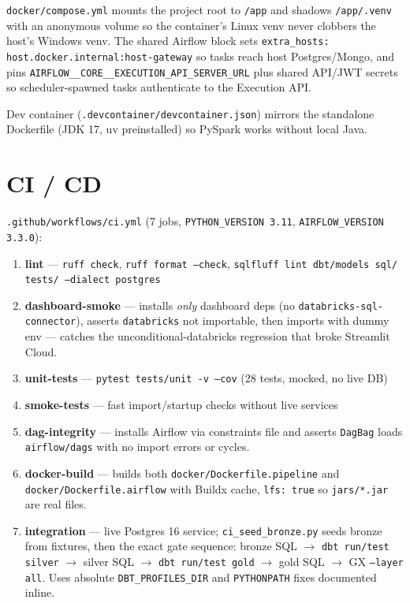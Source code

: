 \documentclass[11pt,a4paper]{article}
\begin{document}
\texttt{docker/compose.yml} mounts the project root to \texttt{/app} and shadows \texttt{/app/.venv} with an anonymous volume so the container's Linux venv never clobbers the host's Windows venv. The shared Airflow block sets \texttt{extra\_hosts: host.docker.internal:host-gateway} so tasks reach host Postgres/Mongo, and pins \texttt{AIRFLOW\_\_CORE\_\_EXECUTION\_API\_SERVER\_URL} plus shared API/JWT secrets so scheduler-spawned tasks authenticate to the Execution API.

Dev container (\texttt{.devcontainer/devcontainer.json}) mirrors the standalone Dockerfile (JDK 17, uv preinstalled) so PySpark works without local Java.

\section{CI / CD}

\texttt{.github/workflows/ci.yml} (7 jobs, \texttt{PYTHON\_VERSION 3.11}, \texttt{AIRFLOW\_VERSION 3.3.0}):

\begin{enumerate}[leftmargin=1.4em,itemsep=2pt]
  \item \textbf{lint} — \texttt{ruff check}, \texttt{ruff format --check}, \texttt{sqlfluff lint dbt/models sql/ tests/ --dialect postgres}
  \item \textbf{dashboard-smoke} — installs \emph{only} dashboard deps (no \texttt{databricks-sql-connector}), asserts \texttt{databricks} not importable, then imports with dummy env — catches the unconditional-databricks regression that broke Streamlit Cloud.
  \item \textbf{unit-tests} — \texttt{pytest tests/unit -v --cov} (28 tests, mocked, no live DB)
  \item \textbf{smoke-tests} — fast import/startup checks without live services
  \item \textbf{dag-integrity} — installs Airflow via constraints file and asserts \texttt{DagBag} loads \texttt{airflow/dags} with no import errors or cycles.
  \item \textbf{docker-build} — builds both \texttt{docker/Dockerfile.pipeline} and \texttt{docker/Dockerfile.airflow} with Buildx cache, \texttt{lfs: true} so \texttt{jars/*.jar} are real files.
  \item \textbf{integration} — live Postgres 16 service; \texttt{ci\_seed\_bronze.py} seeds bronze from fixtures, then the exact gate sequence: bronze SQL $\rightarrow$ \texttt{dbt run/test silver} $\rightarrow$ silver SQL $\rightarrow$ \texttt{dbt run/test gold} $\rightarrow$ gold SQL $\rightarrow$ GX \texttt{--layer all}. Uses absolute \texttt{DBT\_PROFILES\_DIR} and \texttt{PYTHONPATH} fixes documented inline.
\end{enumerate}
\end{document}
